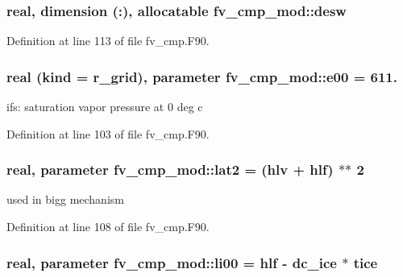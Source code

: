 \subsubsection[{desw}]{\setlength{\rightskip}{0pt plus 5cm}real, dimension (\-:), allocatable fv\-\_\-cmp\-\_\-mod\-::desw\hspace{0.3cm}{\ttfamily [private]}}\label{classfv__cmp__mod_ae014434a6d863ca10c5961edfd866425}


Definition at line 113 of file fv\-\_\-cmp.\-F90.

\subsubsection[{e00}]{\setlength{\rightskip}{0pt plus 5cm}real (kind = r\-\_\-grid), parameter fv\-\_\-cmp\-\_\-mod\-::e00 = 611.\hspace{0.3cm}{\ttfamily [private]}}\label{classfv__cmp__mod_a92f0cf9784defdd98bcf50329e7f6e8b}


ifs\-: saturation vapor pressure at 0 deg c 



Definition at line 103 of file fv\-\_\-cmp.\-F90.

\subsubsection[{lat2}]{\setlength{\rightskip}{0pt plus 5cm}real, parameter fv\-\_\-cmp\-\_\-mod\-::lat2 = (hlv + hlf) $\ast$$\ast$ 2\hspace{0.3cm}{\ttfamily [private]}}\label{classfv__cmp__mod_aad5bf68c9e846169feaa2355a29ec7ae}


used in bigg mechanism 



Definition at line 108 of file fv\-\_\-cmp.\-F90.

\subsubsection[{li00}]{\setlength{\rightskip}{0pt plus 5cm}real, parameter fv\-\_\-cmp\-\_\-mod\-::li00 = hlf -\/ {\bf dc\-\_\-ice} $\ast$ {\bf tice}\hspace{0.3cm}{\ttfamily [private]}}\label{classfv__cmp__mod_aaec2280440ca71e72b152db42e5c4504}

